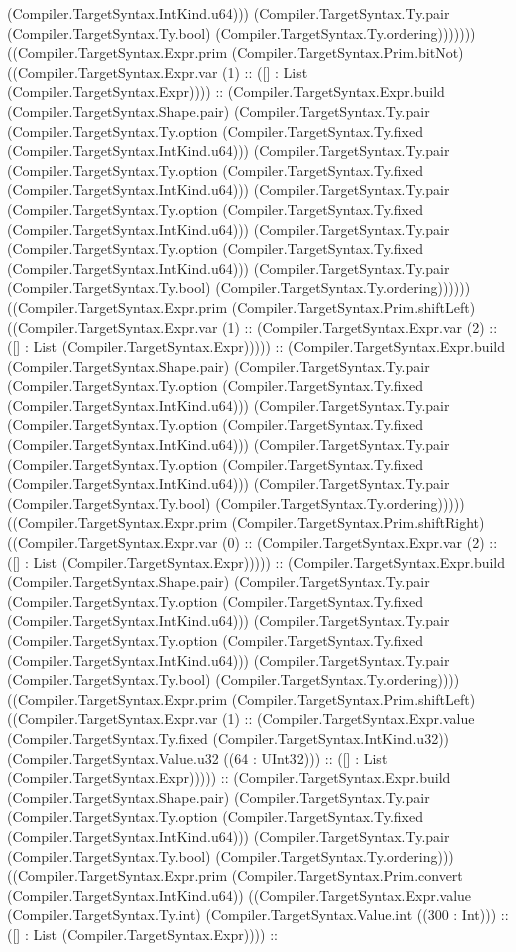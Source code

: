\documentclass[11pt]{article}
\begin{document}
(Compiler.TargetSyntax.IntKind.u64))) (Compiler.TargetSyntax.Ty.pair (Compiler.TargetSyntax.Ty.bool) (Compiler.TargetSyntax.Ty.ordering))))))) ((Compiler.TargetSyntax.Expr.prim (Compiler.TargetSyntax.Prim.bitNot) ((Compiler.TargetSyntax.Expr.var (1) :: ([] : List (Compiler.TargetSyntax.Expr)))) :: (Compiler.TargetSyntax.Expr.build (Compiler.TargetSyntax.Shape.pair) (Compiler.TargetSyntax.Ty.pair (Compiler.TargetSyntax.Ty.option (Compiler.TargetSyntax.Ty.fixed (Compiler.TargetSyntax.IntKind.u64))) (Compiler.TargetSyntax.Ty.pair (Compiler.TargetSyntax.Ty.option (Compiler.TargetSyntax.Ty.fixed (Compiler.TargetSyntax.IntKind.u64))) (Compiler.TargetSyntax.Ty.pair (Compiler.TargetSyntax.Ty.option (Compiler.TargetSyntax.Ty.fixed (Compiler.TargetSyntax.IntKind.u64))) (Compiler.TargetSyntax.Ty.pair (Compiler.TargetSyntax.Ty.option (Compiler.TargetSyntax.Ty.fixed (Compiler.TargetSyntax.IntKind.u64))) (Compiler.TargetSyntax.Ty.pair (Compiler.TargetSyntax.Ty.bool) (Compiler.TargetSyntax.Ty.ordering)))))) ((Compiler.TargetSyntax.Expr.prim (Compiler.TargetSyntax.Prim.shiftLeft) ((Compiler.TargetSyntax.Expr.var (1) :: (Compiler.TargetSyntax.Expr.var (2) :: ([] : List (Compiler.TargetSyntax.Expr))))) :: (Compiler.TargetSyntax.Expr.build (Compiler.TargetSyntax.Shape.pair) (Compiler.TargetSyntax.Ty.pair (Compiler.TargetSyntax.Ty.option (Compiler.TargetSyntax.Ty.fixed (Compiler.TargetSyntax.IntKind.u64))) (Compiler.TargetSyntax.Ty.pair (Compiler.TargetSyntax.Ty.option (Compiler.TargetSyntax.Ty.fixed (Compiler.TargetSyntax.IntKind.u64))) (Compiler.TargetSyntax.Ty.pair (Compiler.TargetSyntax.Ty.option (Compiler.TargetSyntax.Ty.fixed (Compiler.TargetSyntax.IntKind.u64))) (Compiler.TargetSyntax.Ty.pair (Compiler.TargetSyntax.Ty.bool) (Compiler.TargetSyntax.Ty.ordering))))) ((Compiler.TargetSyntax.Expr.prim (Compiler.TargetSyntax.Prim.shiftRight) ((Compiler.TargetSyntax.Expr.var (0) :: (Compiler.TargetSyntax.Expr.var (2) :: ([] : List (Compiler.TargetSyntax.Expr))))) :: (Compiler.TargetSyntax.Expr.build (Compiler.TargetSyntax.Shape.pair) (Compiler.TargetSyntax.Ty.pair (Compiler.TargetSyntax.Ty.option (Compiler.TargetSyntax.Ty.fixed (Compiler.TargetSyntax.IntKind.u64))) (Compiler.TargetSyntax.Ty.pair (Compiler.TargetSyntax.Ty.option (Compiler.TargetSyntax.Ty.fixed (Compiler.TargetSyntax.IntKind.u64))) (Compiler.TargetSyntax.Ty.pair (Compiler.TargetSyntax.Ty.bool) (Compiler.TargetSyntax.Ty.ordering)))) ((Compiler.TargetSyntax.Expr.prim (Compiler.TargetSyntax.Prim.shiftLeft) ((Compiler.TargetSyntax.Expr.var (1) :: (Compiler.TargetSyntax.Expr.value (Compiler.TargetSyntax.Ty.fixed (Compiler.TargetSyntax.IntKind.u32)) (Compiler.TargetSyntax.Value.u32 ((64 : UInt32))) :: ([] : List (Compiler.TargetSyntax.Expr))))) :: (Compiler.TargetSyntax.Expr.build (Compiler.TargetSyntax.Shape.pair) (Compiler.TargetSyntax.Ty.pair (Compiler.TargetSyntax.Ty.option (Compiler.TargetSyntax.Ty.fixed (Compiler.TargetSyntax.IntKind.u64))) (Compiler.TargetSyntax.Ty.pair (Compiler.TargetSyntax.Ty.bool) (Compiler.TargetSyntax.Ty.ordering))) ((Compiler.TargetSyntax.Expr.prim (Compiler.TargetSyntax.Prim.convert (Compiler.TargetSyntax.IntKind.u64)) ((Compiler.TargetSyntax.Expr.value (Compiler.TargetSyntax.Ty.int) (Compiler.TargetSyntax.Value.int ((300 : Int))) :: ([] : List (Compiler.TargetSyntax.Expr)))) :: 
\end{document}
